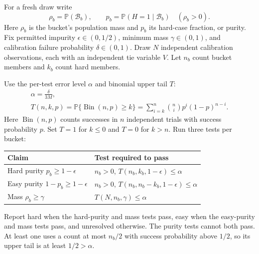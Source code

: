 \documentclass[10pt,letterpaper]{article}
\newcommand{\Prb}{\mathbb P}
\begin{document}
For a fresh draw write
\begin{equation}
 \rho_b=\Prb(\mathcal B_b),\qquad
 p_b=\Prb(H=1\mid\mathcal B_b)\quad(\rho_b>0).
\end{equation}
Here $\rho_b$ is the bucket's population mass and $p_b$ its hard-case fraction, or purity. Fix permitted impurity $\epsilon\in(0,1/2)$, minimum mass $\gamma\in(0,1)$, and calibration failure probability $\delta\in(0,1)$. Draw $N$ independent calibration observations, each with an independent tie variable $V$. Let $n_b$ count bucket members and $k_b$ count hard members.

Use the per-test error level $\alpha$ and binomial upper tail $T$:
\begin{equation}\label{eq:tail}
 \begin{gathered}
 \alpha=\frac{\delta}{3M},\\[3pt]
 T(n,k,p)=\Prb\{\operatorname{Bin}(n,p)\ge k\}
 =\sum_{i=k}^n {n\choose i}p^i(1-p)^{n-i}.
 \end{gathered}
\end{equation}
Here $\operatorname{Bin}(n,p)$ counts successes in $n$ independent trials with success probability $p$. Set $T=1$ for $k\le0$ and $T=0$ for $k>n$. Run three tests per bucket:
\begin{center}
\begin{tabular}{@{}ll@{}}
\toprule
Claim & Test required to pass\\
\midrule
Hard purity $p_b\ge1-\epsilon$ & $n_b>0$, $T(n_b,k_b,1-\epsilon)\le\alpha$\\
Easy purity $1-p_b\ge1-\epsilon$ & $n_b>0$, $T(n_b,n_b-k_b,1-\epsilon)\le\alpha$\\
Mass $\rho_b\ge\gamma$ & $T(N,n_b,\gamma)\le\alpha$\\
\bottomrule
\end{tabular}
\end{center}
Report hard when the hard-purity and mass tests pass, easy when the easy-purity and mass tests pass, and unresolved otherwise. The purity tests cannot both pass. At least one uses a count at most $n_b/2$ with success probability above $1/2$, so its upper tail is at least $1/2>\alpha$.
\end{document}
